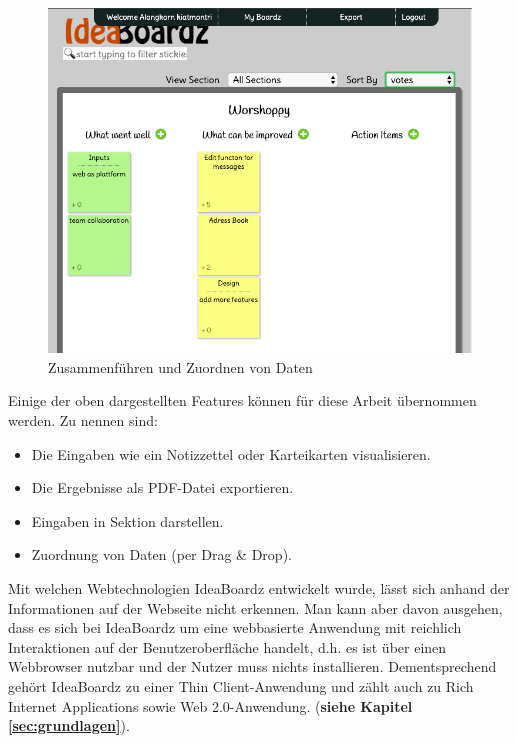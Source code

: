 \begin{figure}[H]
  \begin{center}
    \includegraphics[scale=0.35]{img/ideaBoardz4}
	\caption{Zusammenführen und Zuordnen von Daten} 
	\label{fig:zusammenführen und zuordnen von daten}
  \end{center}   
\end{figure}

\newpage
Einige der oben dargestellten Features können für diese Arbeit übernommen werden. Zu nennen sind:

\begin{itemize}
\item Die Eingaben wie ein Notizzettel oder Karteikarten visualisieren.
\item Die Ergebnisse als PDF-Datei exportieren.
\item Eingaben in Sektion darstellen.
\item Zuordnung von Daten (per Drag \& Drop).
\end{itemize}

Mit welchen Webtechnologien IdeaBoardz entwickelt wurde, lässt sich anhand der Informationen auf der Webseite nicht erkennen. Man kann aber davon ausgehen, dass es sich bei IdeaBoardz um eine webbasierte Anwendung mit reichlich Interaktionen auf der Benutzeroberfläche handelt, d.h. es ist über einen Webbrowser nutzbar und der Nutzer muss nichts installieren. Dementsprechend gehört IdeaBoardz zu einer Thin Client-Anwendung und zählt auch zu Rich Internet Applications sowie Web 2.0-Anwendung. (\textbf{siehe Kapitel \ref{sec:grundlagen}}).

